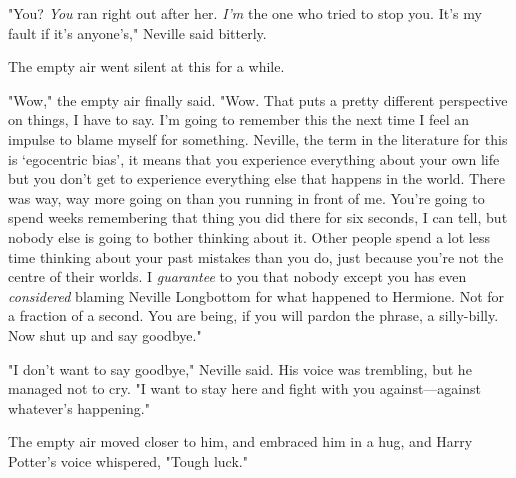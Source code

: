 "You? \emph{You} ran right out after her. \emph{I'm} the one who tried to stop
you. It's my fault if it's anyone's," Neville said bitterly.

The empty air went silent at this for a while.

"Wow," the empty air finally said. "Wow. That puts a pretty different
perspective on things, I have to say. I'm going to remember this the next time
I feel an impulse to blame myself for something. Neville, the term in the
literature for this is `egocentric bias', it means that you experience
everything about your own life but you don't get to experience everything else
that happens in the world. There was way, way more going on than you running in
front of me. You're going to spend weeks remembering that thing you did there
for six seconds, I can tell, but nobody else is going to bother thinking about
it. Other people spend a lot less time thinking about your past mistakes than
you do, just because you're not the centre of their worlds. I \emph{guarantee}
to you that nobody except you has even \emph{considered} blaming Neville
Longbottom for what happened to Hermione. Not for a fraction of a second. You
are being, if you will pardon the phrase, a silly-billy. Now shut up and say
goodbye."

"I don't want to say goodbye," Neville said. His voice was trembling, but he
managed not to cry. "I want to stay here and fight with you against—against
whatever's happening."

The empty air moved closer to him, and embraced him in a hug, and Harry
Potter's voice whispered, "Tough luck."
